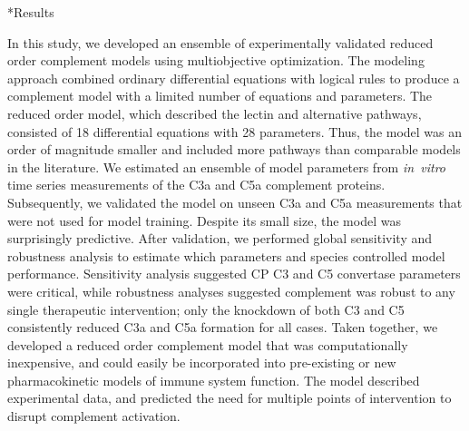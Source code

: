 \documentclass[12pt]{article}
\makeatletter
\renewcommand\section{\@startsection
	{subsection}{2}{0mm}
	{-0.2in}
	{0.05\baselineskip}
	{\normalfont\large\bfseries}}
\makeatother
\begin{document}
\clearpage

\section*{Results}

In this study, we developed an ensemble of experimentally validated reduced order complement models using multiobjective optimization.
The modeling approach combined ordinary differential equations with logical rules to produce a complement model with a limited number of equations and parameters.
The reduced order model,  which described the lectin and alternative pathways, consisted of 18 differential equations with 28 parameters.
Thus, the model was an order of magnitude smaller and included more pathways than comparable models in the literature.
We estimated an ensemble of model parameters from \textit{in~vitro} time series measurements of the C3a and C5a complement proteins.
Subsequently, we validated the model on unseen C3a and C5a measurements that were not used for model training.
Despite its small size, the model was surprisingly predictive.
After validation, we performed global sensitivity and robustness analysis to estimate which parameters and species
controlled model performance. Sensitivity analysis suggested CP C3 and C5 convertase parameters were critical,
while robustness analyses suggested complement was robust to any single therapeutic intervention;
only the knockdown of both C3 and C5 consistently reduced C3a and C5a formation for all cases.
Taken together, we developed a reduced order complement model that was computationally inexpensive,
and could easily be incorporated into pre-existing or new pharmacokinetic models of immune system function.
The model described experimental data, and predicted the need for multiple points of intervention to disrupt complement activation.
\end{document}
